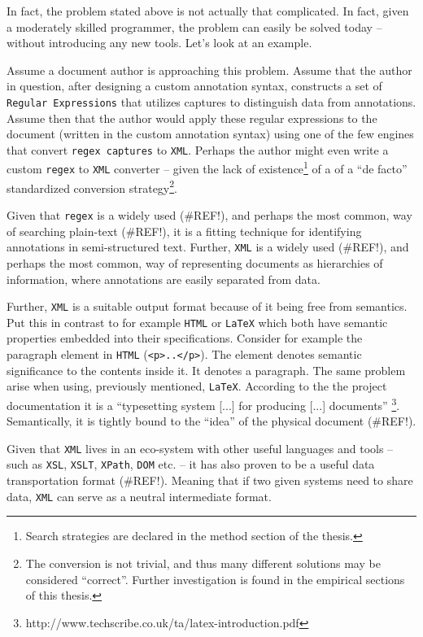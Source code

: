 \documentclass{scrreprt}
\begin{document}
In fact, the problem stated above is not actually that complicated. In fact, given a moderately skilled programmer, the problem can easily be solved today -- without introducing any new tools. Let's look at an example.

Assume a document author is approaching this problem. Assume that the author in question, after designing a custom annotation syntax, constructs a set of \texttt{Regular Expressions} that utilizes captures to distinguish data from annotations. Assume then that the author would apply these regular expressions to the document (written in the custom annotation syntax)  using one of the few engines that convert \texttt{regex captures} to \texttt{XML}. Perhaps the author might even write a custom \texttt{regex} to \texttt{XML} converter -- given the lack of existence\footnote{ Search strategies are declared in the method section of the thesis.} of a of a ``de facto'' standardized conversion strategy\footnote{ The conversion is not trivial, and thus many different solutions may be considered ``correct''. Further investigation is found in the empirical sections of this thesis.}.

Given that \texttt{regex} is a widely used (\#REF!), and perhaps the most common, way of searching plain-text (\#REF!), it is a fitting technique for identifying annotations in semi-structured text. Further, \texttt{XML} is a widely used (\#REF!), and perhaps the most common, way of representing documents as hierarchies of information, where annotations are easily separated from data.

Further, \texttt{XML} is a suitable output format because of it being free from semantics. Put this in contrast to for example \texttt{HTML} or \texttt{LaTeX} which both have semantic properties embedded into their specifications. Consider for example the paragraph element in \texttt{HTML} (\texttt{<p>..</p>}). The element denotes semantic significance to the contents inside it. It denotes a paragraph. The same problem arise when using, previously mentioned, \texttt{LaTeX}. According to the the project documentation it is a ``typesetting system [...] for producing [...] documents'' \footnote{ http://www.techscribe.co.uk/ta/latex-introduction.pdf}. Semantically, it is tightly bound to the ``idea'' of the physical document (\#REF!). 

Given that \texttt{XML} lives in an eco-system with other useful languages and tools -- such as \texttt{XSL}, \texttt{XSLT}, \texttt{XPath}, \texttt{DOM} etc. -- it has also proven to be a useful data transportation format (\#REF!). Meaning that if two given systems need to share data, \texttt{XML} can serve as a neutral intermediate format.
\end{document}
